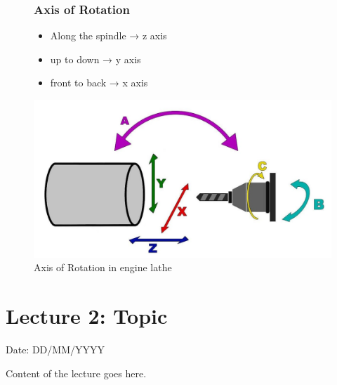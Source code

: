 \documentclass{article}
\begin{document}
\vspace*{0.5cm}
\begin{figure}[ht]
  \subsubsection*{Axis of Rotation}
  \centering
  \begin{minipage}{0.35\linewidth}
      \begin{itemize}
        \item Along the spindle → z axis 
        \item up to down → y axis 
        \item front to back → x axis 
      \end{itemize}
  \end{minipage}%
  \begin{minipage}{0.65\linewidth}
      \centering
      \includegraphics[width=\linewidth]{img/axis.jpeg}
      \caption{Axis of Rotation in engine lathe}
      \label{fig:axis}
  \end{minipage}
\end{figure}




\newpage

\section{Lecture 2: Topic}
\hfill Date: DD/MM/YYYY

Content of the lecture goes here.
\end{document}
